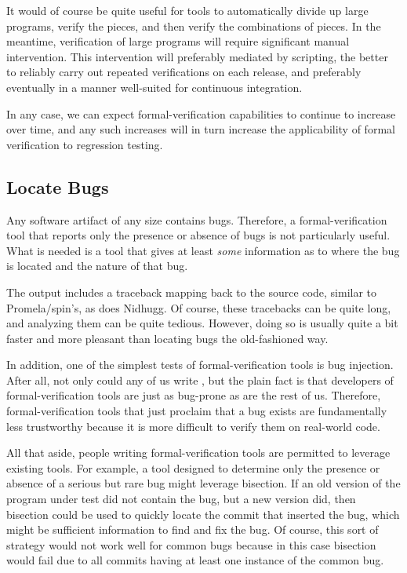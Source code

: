 It would of course be quite useful for tools to automatically divide
up large programs, verify the pieces, and then verify the combinations
of pieces.
In the meantime, verification of large programs will require significant
manual intervention.
This intervention will preferably mediated by scripting, the better to
reliably carry out repeated verifications on each release, and
preferably eventually in a manner well-suited for continuous integration.

In any case, we can expect formal-verification capabilities to continue
to increase over time, and any such increases will in turn increase
the applicability of formal verification to regression testing.

\subsection{Locate Bugs}
\label{sec:future:Locate Bugs}

Any software artifact of any size contains bugs.
Therefore, a formal-verification tool that reports only the
presence or absence of bugs is not particularly useful.
What is needed is a tool that gives at least \emph{some} information
as to where the bug is located and the nature of that bug.

The  output includes a traceback mapping back to the source
code, similar to Promela/spin's, as does Nidhugg.
Of course, these tracebacks can be quite long, and analyzing them
can be quite tedious.
However, doing so is usually quite a bit faster
and more pleasant than locating bugs the old-fashioned way.

In addition, one of the simplest tests of formal-verification tools is
bug injection.
After all, not only could any of us write
, but the plain fact is that
developers of formal-verification tools are just as bug-prone as
are the rest of us.
Therefore, formal-verification tools that just proclaim that a
bug exists are fundamentally less trustworthy because it is
more difficult to verify them on real-world code.

All that aside, people writing formal-verification tools are
permitted to leverage existing tools.
For example, a tool designed to determine only the presence
or absence of a serious but rare bug might leverage bisection.
If an old version of the program under test did not contain the bug,
but a new version did, then bisection could be used to quickly
locate the commit that inserted the bug, which might be
sufficient information to find and fix the bug.
Of course, this sort of strategy would not work well for common
bugs because in this case bisection would fail due to all commits
having at least one instance of the common bug.

